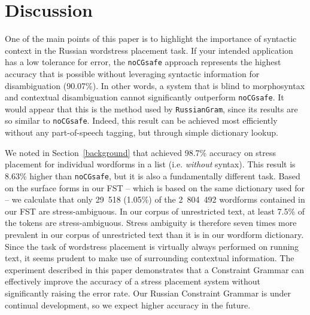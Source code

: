 \documentclass[11pt]{article}
\newcommand{\rr}[1]{\marginpar{\scriptsize R: #1}} %
\begin{document}
\section{Discussion} \label{discussion}

One of the main points of this paper is to highlight the importance of 
syntactic context in the Russian wordstress placement task. If your intended 
application has a low tolerance for error, the 
{\small {\tt noCGsafe}} approach represents the highest accuracy that is possible 
without leveraging syntactic information for disambiguation (90.07\%). In other words, a 
system that is blind to morphosyntax and contextual disambiguation cannot
significantly outperform {\small {\tt noCGsafe}}. It would appear that this is
the method used by {\small {\tt RussianGram}}, since its results are so similar
to {\small {\tt noCGsafe}}. Indeed, this result can be achieved most efficiently
without any part-of-speech tagging, but through simple dictionary lookup.

We noted in Section~\ref{background} that 
achieved 98.7\% accuracy on stress placement for individual wordforms 
in a list (i.e. \emph{without} syntax). This result is 8.63\% higher than
{\small {\tt noCGsafe}}, but it is also a fundamentally different task.
Based on the surface 
forms in our FST -- which is based on the same dictionary used for 
 -- 
we calculate that only 29~518 (1.05\%) 
of the 2~804~492 wordforms contained in our FST are stress-ambiguous.
In our corpus of unrestricted text, at least 7.5\% of the tokens are 
stress-ambiguous. Stress ambiguity is therefore seven times more prevalent in our 
corpus of unrestricted text than it is in our wordform dictionary.
Since the task of wordstress placement is virtually always performed on
running text, it seems prudent to make use of surrounding contextual information.
The experiment described in this paper demonstrates that a Constraint Grammar
can effectively improve the accuracy of a stress placement system without 
significantly raising the error rate. Our Russian Constraint Grammar is
under continual development, so we expect higher accuracy in the future.
\end{document}
